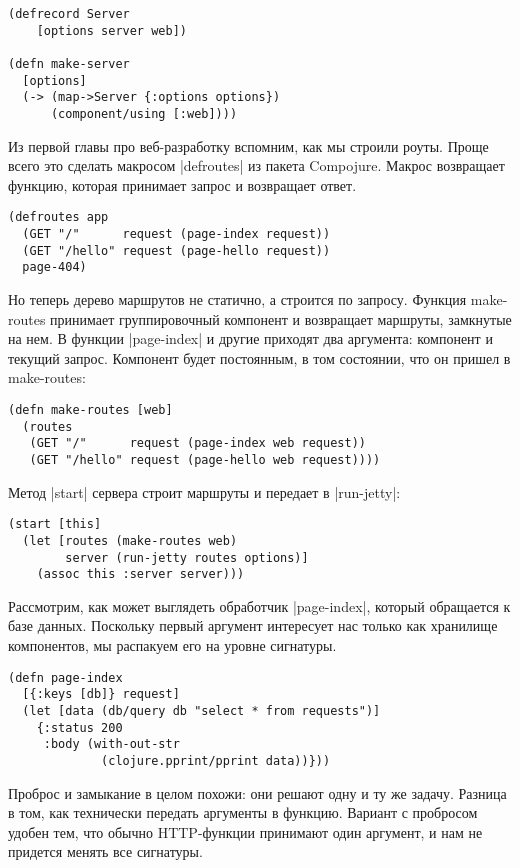 \begin{verbatim}
(defrecord Server
    [options server web])

(defn make-server
  [options]
  (-> (map->Server {:options options})
      (component/using [:web])))
\end{verbatim}

Из первой главы про веб-разработку вспомним, как мы строили роуты. Проще всего
это сделать макросом \spverb|defroutes| из пакета Compojure. Макрос возвращает функцию,
которая принимает запрос и возвращает ответ.

\begin{verbatim}
(defroutes app
  (GET "/"      request (page-index request))
  (GET "/hello" request (page-hello request))
  page-404)
\end{verbatim}

Но теперь дерево маршрутов не статично, а строится по запросу. Функция
make-routes принимает группировочный компонент и возвращает маршруты, замкнутые
на нем. В функции \spverb|page-index| и другие приходят два аргумента: компонент и
текущий запрос. Компонент будет постоянным, в том состоянии, что он пришел в
make-routes:

\begin{verbatim}
(defn make-routes [web]
  (routes
   (GET "/"      request (page-index web request))
   (GET "/hello" request (page-hello web request))))
\end{verbatim}

Метод \spverb|start| сервера строит маршруты и передает в \spverb|run-jetty|:

\begin{verbatim}
(start [this]
  (let [routes (make-routes web)
        server (run-jetty routes options)]
    (assoc this :server server)))
\end{verbatim}

Рассмотрим, как может выглядеть обработчик \spverb|page-index|, который обращается к
базе данных. Поскольку первый аргумент интересует нас только как хранилище
компонентов, мы распакуем его на уровне сигнатуры.

\begin{verbatim}
(defn page-index
  [{:keys [db]} request]
  (let [data (db/query db "select * from requests")]
    {:status 200
     :body (with-out-str
             (clojure.pprint/pprint data))}))
\end{verbatim}

Проброс и замыкание в целом похожи: они решают одну и ту же задачу. Разница в
том, как технически передать аргументы в функцию. Вариант с пробросом удобен
тем, что обычно HTTP-функции принимают один аргумент, и нам не придется менять
все сигнатуры.


